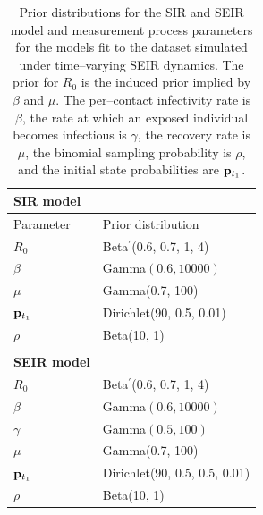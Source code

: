 \begin{table}[htbp]
	\centering
	\begin{tabular}{ll}
		\textbf{SIR model} & \\
		\hline\hline
		Parameter & Prior distribution \\ 
		\hline
		$ R_0 $ &  Beta$ ^\prime $(0.6, 0.7, 1, 4) \\
		$ \beta $ &  Gamma$ (0.6, 10000) $ \\
		$ \mu $ &  Gamma(0.7, 100) \\ 
		$ \mathbf{p}_{t_1} $ &  Dirichlet(90, 0.5, 0.01)  \\ 
		$ \rho $ &  Beta(10, 1) \\
		\hline	
		&\\
		\textbf{SEIR model} & \\
		\hline\hline
		$ R_0 $ &  Beta$ ^\prime $(0.6, 0.7, 1, 4) \\
		$ \beta $ &  Gamma$ (0.6, 10000) $ \\
		$ \gamma $ &  Gamma$ (0.5, 100) $\\ 
		$ \mu $ &  Gamma(0.7, 100) \\ 
		$ \mathbf{p}_{t_1} $ &  Dirichlet(90, 0.5, 0.5, 0.01)  \\ 
		$ \rho $ &  Beta(10, 1) \\
		\hline
	\end{tabular}
	\caption[Simulation 2 priors for SIR and SEIR models.]{Prior distributions for the SIR and SEIR model and measurement process parameters for the models fit to the dataset simulated under time--varying SEIR dynamics. The prior for $ R_0 $ is the induced prior implied by $ \beta $ and $ \mu $. The per--contact infectivity rate is $ \beta $, the rate at which an exposed individual becomes infectious is $ \gamma $, the recovery rate is $ \mu $, the binomial sampling probability is $ \rho $, and the initial state probabilities are $ \mathbf{p}_{t_1} $.}
	\label{tab:misspec_priors}
\end{table}

\newpage

